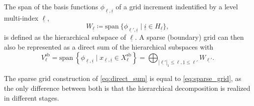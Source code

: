 \documentclass[
  a4paper,  %
  twoside,  %
  bibliography=totoc,
  headsepline,
  cleardoublepage=empty,
  parskip=half,
  draft=false
]{scrbook}
\begin{document}
\begin{definition}
The span of the basis functions $\phi_{\underline{\ell},\underline{i}}$ of a grid increment indentified by a level multi-index $\underline{\ell}$,
\begin{equation}
W_{\underline{\ell}} \coloneqq \mathrm{span}~ \{\phi_{\underline{\ell'},\underline{i}} \mid \underline{i} \in H_{\underline{\ell}}\},
\end{equation}
is defined as the hierarchical subspace of $\underline{\ell}$.
A sparse (boundary) grid can then also be represented as a direct sum of the hierarchical subspaces with
\begin{equation}
V^{\mathrm{sb}}_{\ell} = \mathrm{span}~ \left\{\phi_{\underline{\ell},\underline{i}} \mid x_{\underline{\ell},\underline{i}} \in X^{\mathrm{sb}}_{\ell}\right\}=\bigoplus_{|\underline{\ell'}|_1 \leq \ell, \underline{1} \leq \ell'} W_{\underline{\ell'}}.
\label{eq:direct_sum}
\end{equation}
\end{definition}
%
The sparse grid construction of \cref{eq:direct_sum} is equal to \cref{eq:sparse_grid}, as the only difference between both is that the hierarchical decomposition is realized in different stages.
\end{document}
